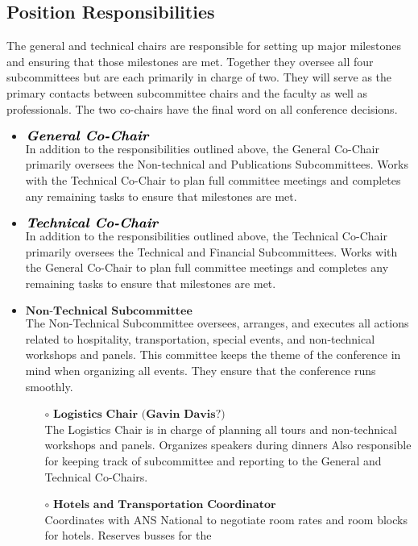\subsection{Position Responsibilities}
The general and technical chairs are responsible for setting up major milestones and 
ensuring that those milestones are met. Together they oversee all four subcommittees but 
are each primarily in charge of two. They will serve as the primary contacts between subcommittee
chairs and the faculty as well as professionals. The two co-chairs have the final word on all 
conference decisions.

\begin{itemize}
	\item $\large\textbf{\textit{General Co-Chair}}$\\
	In addition to the responsibilities outlined above, the General Co-Chair primarily oversees the
	Non-technical and Publications Subcommittees. Works with the Technical Co-Chair to plan full committee
	meetings and completes any remaining tasks to ensure that milestones are met.
	\item $\large\textbf{\textit{Technical Co-Chair}}$\\
	In addition to the responsibilities outlined above, the Technical Co-Chair primarily oversees the
	Technical and Financial Subcommittees. Works with the General Co-Chair to plan full committee
	meetings and completes any remaining tasks to ensure that milestones are met.
	\item $\textbf{Non-Technical Subcommittee}$\\
	The Non-Technical Subcommittee oversees, arranges, and executes all actions related to hospitality, transportation, special events, and non-technical workshops and panels. This committee keeps the theme of the conference in mind when organizing all events. They ensure that the conference runs smoothly.
	\begin{itemize}
		\item[$\circ$] $\textbf{Logistics Chair (Gavin Davis?)}$\\
		The Logistics Chair is in charge of planning all tours and non-technical workshops and panels. Organizes speakers during dinners
		Also responsible for keeping track of subcommittee and reporting to the General and Technical Co-Chairs.
		\item[$\circ$] $\textbf{Hotels and Transportation Coordinator}$\\
		Coordinates with ANS National to negotiate room rates and room blocks for hotels. Reserves busses for the 

\end{itemize}
\end{itemize}
